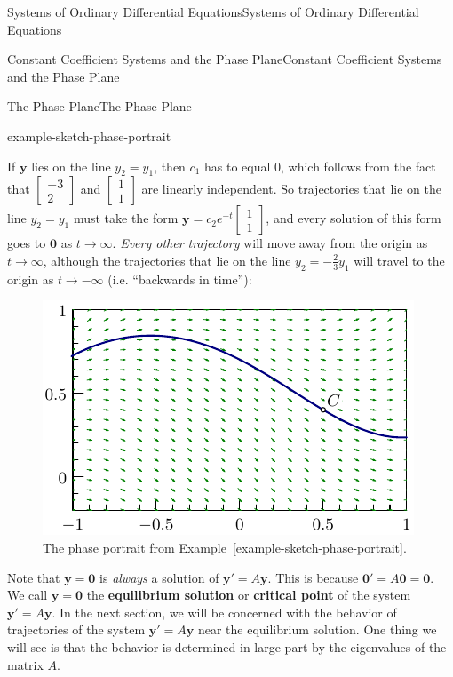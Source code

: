 \documentclass[10pt,]{book}
\newcommand{\terminology}[1]{\textbf{#1}}
\numberwithin{equation}{section}
\renewcommand{\vec}[1]{\mathbf{#1}}
\begin{document}
\begin{chapterptx}{Systems of Ordinary Differential Equations}{}{Systems of Ordinary Differential Equations}{}{}
\begin{sectionptx}{Constant Coefficient Systems and the Phase Plane}{}{Constant Coefficient Systems and the Phase Plane}{}{}
\begin{subsectionptx}{The Phase Plane}{}{The Phase Plane}{}{}
\begin{example}{}{example-sketch-phase-portrait}
\begin{equation*}
\end{equation*}
%
\par
\hypertarget{p-373}{}%
If \(\vec{y}\) lies on the line \(y_{2} = y_{1}\), then \(c_{1}\) has to equal \(0\), which follows from the fact that \(\begin{bmatrix}-3\\2\end{bmatrix}\) and \(\begin{bmatrix}1\\1\end{bmatrix}\) are linearly independent. So trajectories that lie on the line \(y_{2} = y_{1}\) must take the form \(\vec{y} = c_{2}e^{-t}\begin{bmatrix}1\\1\end{bmatrix}\), and every solution of this form goes to \(\vec{0}\) as \(t\to\infty\). \emph{Every other trajectory} will move away from the origin as \(t\to\infty\), although the trajectories that lie on the line \(y_{2} = -\frac{2}{3}y_{1}\) will travel to the origin as \(t\to-\infty\) (i.e. ``backwards in time''):%
\end{example}
\begin{figure}
\centering
\includegraphics[width=1\linewidth]{images/image-15.pdf}
\caption{The phase portrait from \hyperref[example-sketch-phase-portrait]{Example~\ref{example-sketch-phase-portrait}}.\label{figure-sketch-phase-portrait}}
\end{figure}
\hypertarget{p-374}{}%
Note that \(\vec{y}=\vec{0}\) is \emph{always} a solution of \(\vec{y}'=A\vec{y}\). This is because \(\vec{0}'=A\vec{0} = \vec{0}\). We call \(\vec{y} = \vec{0}\) the \terminology{equilibrium solution} or \terminology{critical point} of the system \(\vec{y}'=A\vec{y}\). In the next section, we will be concerned with the behavior of trajectories of the system \(\vec{y}'=A\vec{y}\) near the equilibrium solution. One thing we will see is that the behavior is determined in large part by the eigenvalues of the matrix \(A\).%

\end{subsectionptx}
\end{sectionptx}
\end{chapterptx}
\end{document}
